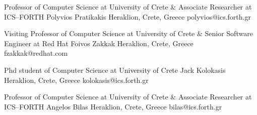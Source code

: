 


\begin{cventries}

  \cventry
    {Professor of Computer Science at University of Crete \& Associate Researcher at ICS--FORTH} %
    {Polyvios Pratikakis} %
    {Heraklion, Crete, Greece} %
    {} %
    {
        polyvios@ics.forth.gr
    }

  \cventry
    {Visiting Professor of Computer Science at University of Crete \& Senior Software Engineer at Red Hat} %
    {Foivos Zakkak} %
    {Heraklion, Crete, Greece} %
    {} %
    {
        fzakkak@redhat.com
    }

  \cventry
    {Phd student of Computer Science at University of Crete} %
    {Jack Kolokasis} %
    {Heraklion, Crete, Greece} %
    {} %
    {
        kolokasis@ics.forth.gr
    }

  \cventry
    {Professor of Computer Science at University of Crete  \& Associate Researcher at ICS--FORTH} %
    {Angelos Bilas} %
    {Heraklion, Crete, Greece} %
    {} %
    {
       bilas@ics.forth.gr
    }

\end{cventries}
